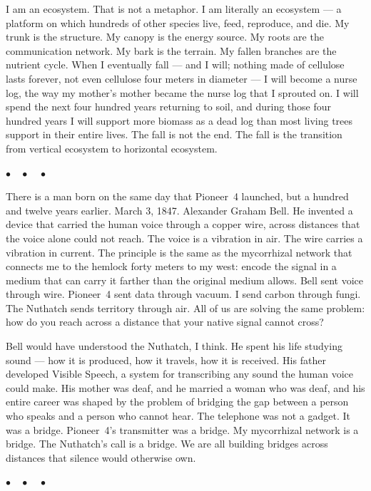 \documentclass[12pt, letterpaper]{article}
\begin{document}
I am an ecosystem. That is not a metaphor. I am literally an ecosystem --- a platform on which hundreds of other species live, feed, reproduce, and die. My trunk is the structure. My canopy is the energy source. My roots are the communication network. My bark is the terrain. My fallen branches are the nutrient cycle. When I eventually fall --- and I will; nothing made of cellulose lasts forever, not even cellulose four meters in diameter --- I will become a nurse log, the way my mother's mother became the nurse log that I sprouted on. I will spend the next four hundred years returning to soil, and during those four hundred years I will support more biomass as a dead log than most living trees support in their entire lives. The fall is not the end. The fall is the transition from vertical ecosystem to horizontal ecosystem.

\begin{center}
$\bullet\quad\bullet\quad\bullet$
\end{center}

There is a man born on the same day that Pioneer~4 launched, but a hundred and twelve years earlier. March 3, 1847. Alexander Graham Bell. He invented a device that carried the human voice through a copper wire, across distances that the voice alone could not reach. The voice is a vibration in air. The wire carries a vibration in current. The principle is the same as the mycorrhizal network that connects me to the hemlock forty meters to my west: encode the signal in a medium that can carry it farther than the original medium allows. Bell sent voice through wire. Pioneer~4 sent data through vacuum. I send carbon through fungi. The Nuthatch sends territory through air. All of us are solving the same problem: how do you reach across a distance that your native signal cannot cross?

Bell would have understood the Nuthatch, I think. He spent his life studying sound --- how it is produced, how it travels, how it is received. His father developed Visible Speech, a system for transcribing any sound the human voice could make. His mother was deaf, and he married a woman who was deaf, and his entire career was shaped by the problem of bridging the gap between a person who speaks and a person who cannot hear. The telephone was not a gadget. It was a bridge. Pioneer~4's transmitter was a bridge. My mycorrhizal network is a bridge. The Nuthatch's call is a bridge. We are all building bridges across distances that silence would otherwise own.

\begin{center}
$\bullet\quad\bullet\quad\bullet$
\end{center}
\end{document}
